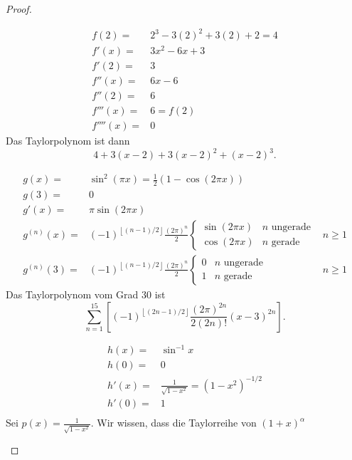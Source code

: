 \begin{proof}
	\begin{parts}
	\item 
		{\allowdisplaybreaks
		\begin{align*}
			f(2)=&2^3-3(2)^2+3(2)+2=4\\
			f'(x)=&3x^2-6x+3\\
			f'(2)=&3\\
			f''(x)=&6x-6\\
			f''(2)=&6\\
			f'''(x)=&6=f(2)\\
			f''''(x)=&0
		\end{align*}
	}
		Das Taylorpolynom ist dann
		\[
		4+3(x-2)+3(x-2)^2+(x-2)^3
		.\] 
	\item {\allowdisplaybreaks
		\begin{align*}
			g(x)=&\sin^2(\pi x)=\frac{1}{2}\left( 1-\cos(2\pi x) \right) \\
			g(3)=&0\\
			g'(x)=&\pi \sin(2\pi x)\\
			g^{(n)}(x)=&\left( -1 \right)^{\left\lfloor (n-1) / 2 \right\rfloor}\frac{(2\pi)^{n}}{2}\begin{cases}
				\sin(2\pi x) & n\text{ ungerade}\\
				\cos(2\pi x) & n\text{ gerade}
			\end{cases} & n\geq 1\\
				g^{(n)}(3)=& \left( -1 \right) ^{\left\lfloor (n - 1) / 2 \right\rfloor}\frac{(2\pi)^n}{2}\begin{cases}
					0 & n\text{ ungerade}\\
					1 & n\text{ gerade}	
				\end{cases} & n \ge 1
		\end{align*}
	}
		Das Taylorpolynom vom Grad 30 ist
		\[
			\sum_{n=1}^{15}\left[ \left( -1 \right) ^{\left\lfloor (2n -1) / 2 \right\rfloor}\frac{(2\pi)^{2n}}{2(2n)!}(x-3)^{2n}\right]
		.\] 
	\item
		{\allowdisplaybreaks
		\begin{align*}
			h(x)=& \sin^{-1}x\\
			h(0)=&0\\
			h'(x)=&\frac{1}{\sqrt{1-x^2} }=(1-x^2)^{-1 / 2}\\
			h'(0)=&1\\
		\end{align*}
		Sei $p(x)=\frac{1}{\sqrt{1-x^2} }$. Wir wissen, dass die Taylorreihe von $(1+x)^\alpha$
		\begin{equation}\tag{5.6.41}

\end{equation}}
\end{parts}
\end{proof}
